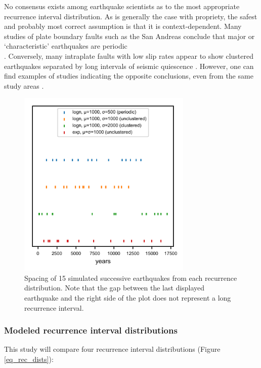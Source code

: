 \documentclass[se]{copernicus}
\begin{document}
No consensus exists among earthquake scientists as to the most
appropriate recurrence interval distribution. As is generally the case
with propriety, the safest and probably most correct assumption is that
it is context-dependent. Many studies of plate boundary faults such as
the San Andreas conclude that major or `characteristic' earthquakes are
periodic\\
\citep[e.g.,][]{berryman_major_2012, scharer_quasi-periodic_2010}.
Conversely, many intraplate faults with low slip rates appear to show
clustered earthquakes separated by long intervals of seismic quiescence
\citep[e.g.,][]{clark_long-term_2012}. However, one can find examples of
studies indicating the opposite conclusions, even from the same study areas
\citep{tuttle_earthquake_2002, grant_paleoseismic_1994}.


\begin{figure}[t]
  \includegraphics[width=8.3cm]{./figures/event_spacing.pdf}
  \caption{Spacing of 15 simulated successive earthquakes from each recurrence 
  distribution. Note that the gap between the last displayed earthquake and the 
  right side of the plot does not represent a long recurrence interval. 
  \label{eq_spacing}}
\end{figure}

\subsubsection{Modeled recurrence interval
distributions}\label{modeled-recurrence-interval-distributions}

This study will compare four recurrence interval distributions (Figure
\ref{eq_rec_dists}):
\end{document}
